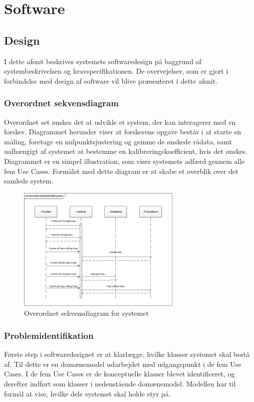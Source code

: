    
\section{Software}
\subsection{Design}
I dette afsnit beskrives systemets softwaredesign på baggrund af systembeskrivelsen og kravspecifikationen. De overvejelser, som er gjort i forbindelse med design af software vil blive præsenteret i dette afsnit.

\subsubsection{Overordnet sekvensdiagram}
Overordnet set ønskes det at udvikle et system, der kan interagerer med en forsker. Diagrammet herunder viser at forskerens opgave består i at starte en måling, foretage en nulpunktsjustering og gemme de ønskede rådata, samt uafhængigt af systemet at bestemme en kalibreringskoefficient, hvis det ønskes. Diagrammet er en simpel illustration, som viser systemets adfærd gennem alle fem Use Cases. Formålet med dette diagram er at skabe et overblik over det samlede system.

\begin{figure}[H]
	\centering
	\includegraphics[width=0.7\textwidth]{Figurer/OverordnetSD}
	\caption{Overordnet sekvensdiagram for systemet}
	\label{fig:Overordnet sekvensdiagram for systemet}
\end{figure}

\subsubsection{Problemidentifikation}
Første step i softwaredesignet er at klarlægge, hvilke klasser systemet skal bestå af. Til dette er en domænemodel udarbejdet med udgangspunkt i de fem Use Cases. I de fem Use Cases er de konceptuelle klasser blevet identificeret, og derefter indført som klasser i nedenstående domænemodel. Modellen har til formål at vise, hvilke dele systemet skal holde styr på. 

